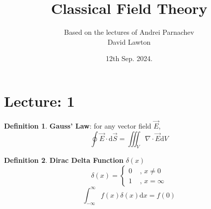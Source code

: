 \documentclass{article}
\title{Classical Field Theory}
\author{Based on the lectures of Andrei Parnachev\\David Lawton}
\date{12th Sep. 2024.}
\theoremstyle{definition}
\newtheorem{definition}{Definition}[section]
\theoremstyle{remark}
\begin{document}
\maketitle

\tableofcontents

\newpage

\section{Lecture: 1}
\begin{definition}
    \textbf{Gauss' Law}: for any vector field $\vec{E}$,\\ 
    \begin{equation}
    \oint \vec{E}\cdot \mathrm{d}\vec{S}=\iiint_V \nabla\cdot\vec{E}\mathrm{d}V
    \end{equation}
\end{definition}
\begin{definition}   
    \textbf{Dirac Delta Function} $\delta(x)$
    \begin{equation}
        \delta(x) = 
        \begin{cases}
            0 & \text{ , }x\neq 0\\
            1 & \text{ , }x=\infty
        \end{cases}
    \end{equation}
    \begin{equation}
        \int_{-\infty}^{\infty} f(x)\delta(x)\mathrm{d}x=f(0)
    \end{equation}
\end{definition} 
\end{document}
